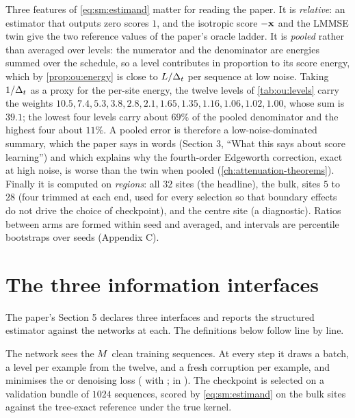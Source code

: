 Three features of \cref{eq:sm:estimand} matter for reading the paper. It is
\emph{relative}: an estimator that outputs zero scores $1$, and the isotropic score
$-\mathbf{x}$ and the LMMSE twin give the two reference values of the paper's oracle ladder.
It is \emph{pooled} rather than averaged over levels: the numerator and the denominator
are energies summed over the schedule, so a level contributes in proportion to its
score energy, which by \cref{prop:ou:energy} is close to $L/\Delta_t$ per sequence at
low noise. Taking $1/\Delta_t$ as a proxy for the per-site energy, the twelve levels of
\cref{tab:ou:levels} carry the weights $10.5, 7.4, 5.3, 3.8, 2.8, 2.1, 1.65, 1.35,
1.16, 1.06, 1.02, 1.00$, whose sum is $39.1$; the lowest four levels carry about
$69\%$ of the pooled denominator and the highest four about $11\%$. A pooled error is
therefore a low-noise-dominated summary, which the paper says in words (Section 3,
``What this says about score learning'') and which explains why the fourth-order
Edgeworth correction, exact at high noise, is worse than the twin when pooled
(\cref{ch:attenuation-theorems}). Finally it is computed on \emph{regions}: all
$32$ sites (the headline), the bulk, sites $5$ to $28$ (four trimmed at each end, used
for every selection so that boundary effects do not drive the choice of checkpoint),
and the centre site (a diagnostic). Ratios between arms are formed within seed and
averaged, and intervals are percentile bootstraps over seeds (Appendix C).

\section{The three information interfaces}
\label{sec:sm:interfaces}

The paper's Section 5 declares three interfaces and reports the structured
estimator against the networks at each. The definitions below follow
 line by line.

\begin{definition}
\label{def:sm:A}
The network sees the $M$ clean training sequences. At every step it draws a batch,
a level per example from the twelve, and a fresh corruption per example, and minimises
the  or  denoising loss ( with
;  in ). The checkpoint is
selected on a validation bundle of $1024$ sequences, scored by
\cref{eq:sm:estimand} on the bulk sites against the tree-exact reference under the
true kernel.
\end{definition}

